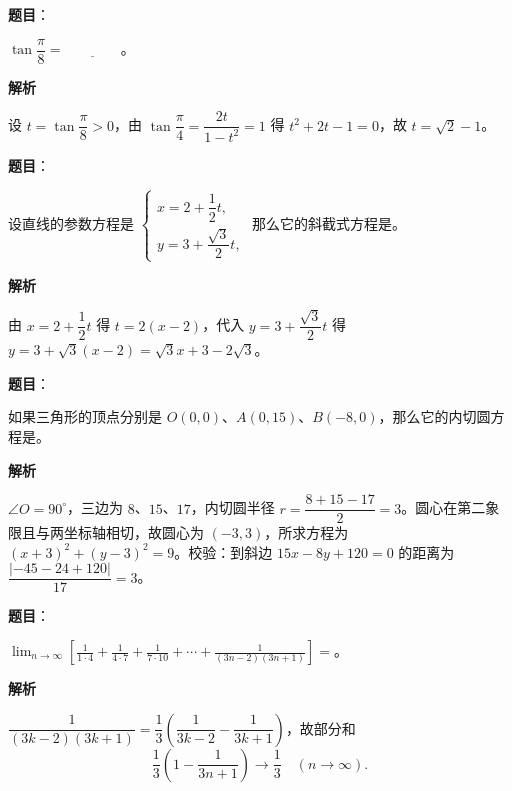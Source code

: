 \begin{answer}

\textbf{题目}：

$\tan\dfrac\pi8=\underline{\qquad\qquad}$。

\textbf{解析}

设 $t=\tan\dfrac{\pi}{8}>0$，由 $\tan\dfrac{\pi}{4}=\dfrac{2t}{1-t^2}=1$ 得 $t^2+2t-1=0$，故 $t=\sqrt2-1$。


\end{answer}
\begin{answer}

\textbf{题目}：

设直线的参数方程是 $\begin{cases}x=2+\dfrac12t,\\y=3+\dfrac{\sqrt3}{2}t,\end{cases}$ 那么它的斜截式方程是\underline{\qquad\qquad}。

\textbf{解析}

由 $x=2+\dfrac12t$ 得 $t=2(x-2)$，代入 $y=3+\dfrac{\sqrt3}{2}t$ 得 $y=3+\sqrt3(x-2)=\sqrt3x+3-2\sqrt3$。


\end{answer}
\begin{answer}

\textbf{题目}：

如果三角形的顶点分别是 $O(0,0)$、$A(0,15)$、$B(-8,0)$，那么它的内切圆方程是\underline{\qquad\qquad}。

\textbf{解析}

$\angle O=90^\circ$，三边为 $8$、$15$、$17$，内切圆半径 $r=\dfrac{8+15-17}{2}=3$。圆心在第二象限且与两坐标轴相切，故圆心为 $(-3,3)$，所求方程为 $(x+3)^2+(y-3)^2=9$。校验：到斜边 $15x-8y+120=0$ 的距离为 $\dfrac{|-45-24+120|}{17}=3$。


\end{answer}
\begin{answer}

\textbf{题目}：

$\displaystyle\lim_{n\to\infty}\left[\frac1{1\cdot4}+\frac1{4\cdot7}+\frac1{7\cdot10}+\cdots+\frac1{(3n-2)(3n+1)}\right]=$\underline{\qquad\qquad}。

\textbf{解析}

$\dfrac{1}{(3k-2)(3k+1)}=\dfrac13\left(\dfrac{1}{3k-2}-\dfrac{1}{3k+1}\right)$，故部分和
\nopagebreak[4]
\[
\frac13\left(1-\frac{1}{3n+1}\right)\to\frac13\quad(n\to\infty).
\]


\end{answer}
